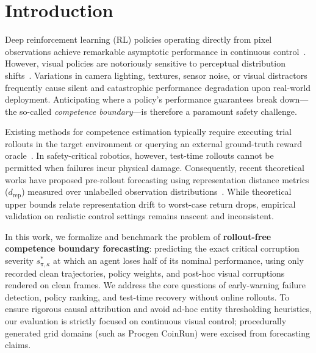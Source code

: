 \section{Introduction}
\label{sec:intro}

Deep reinforcement learning (RL) policies operating directly from pixel observations achieve remarkable asymptotic performance in continuous control~\citep{yarats2021drqv2,hansen2021svea}. However, visual policies are notoriously sensitive to perceptual distribution shifts~\citep{cobbe2020procgen}. Variations in camera lighting, textures, sensor noise, or visual distractors frequently cause silent and catastrophic performance degradation upon real-world deployment. 
Anticipating where a policy's performance guarantees break down---the so-called \emph{competence boundary}---is therefore a paramount safety challenge.

Existing methods for competence estimation typically require executing trial rollouts in the target environment or querying an external ground-truth reward oracle~\citep{majumdar2025predictive}. In safety-critical robotics, however, test-time rollouts cannot be permitted when failures incur physical damage. Consequently, recent theoretical works have proposed pre-rollout forecasting using representation distance metrics ($d_\mathrm{rep}$) measured over unlabelled observation distributions~\citep{lyu2024generalization}. While theoretical upper bounds relate representation drift to worst-case return drops, empirical validation on realistic control settings remains nascent and inconsistent.

In this work, we formalize and benchmark the problem of \textbf{rollout-free competence boundary forecasting}: predicting the exact critical corruption severity $s^*_{\pi,\kappa}$ at which an agent loses half of its nominal performance, using only recorded clean trajectories, policy weights, and post-hoc visual corruptions rendered on clean frames. We address the core questions of early-warning failure detection, policy ranking, and test-time recovery without online rollouts.
To ensure rigorous causal attribution and avoid ad-hoc entity thresholding heuristics, our evaluation is strictly focused on continuous visual control; procedurally generated grid domains (such as Procgen CoinRun) were excised from forecasting claims.

